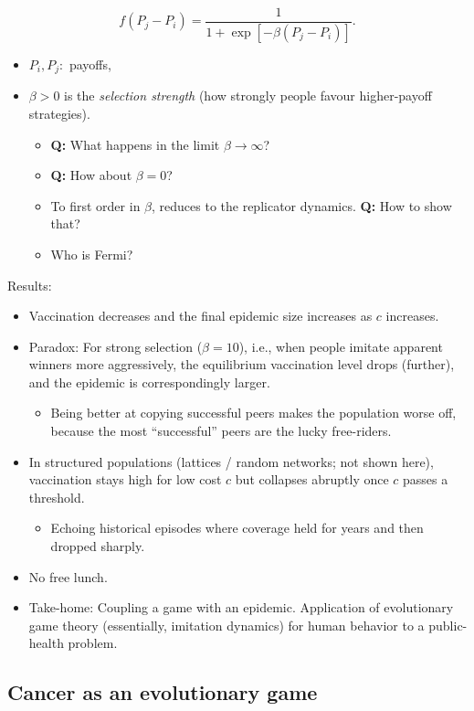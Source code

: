 \documentclass[20pt]{extarticle}
\begin{document}
\begin{itemize}
\[ f(P_j - P_i) = \frac{1}{1 + \exp[-\beta (P_j - P_i)]}. \]
	\begin{itemize}
	\item $P_i, P_j:$ payoffs,
	\item $\beta>0$ is the \emph{selection strength} (how strongly people favour higher-payoff strategies).
		\begin{itemize}
		\item \textbf{Q:} What happens in the limit $\beta\to\infty$?
		\item \textbf{Q:} How about $\beta = 0$?
		\item To first order in $\beta$, reduces to the replicator dynamics. \textbf{Q:} How to show that?
		\item Who is Fermi?
		\end{itemize}
	\end{itemize}
\end{itemize}

Results:
\begin{itemize}
\item Vaccination decreases and the final epidemic size increases as $c$ increases.
\item Paradox: For strong selection ($\beta = 10$), i.e., when people imitate apparent winners more aggressively, the equilibrium vaccination level drops (further), and the epidemic is correspondingly larger.
	\begin{itemize}
	\item Being better at copying successful peers makes the population worse off, because the most ``successful'' peers are the lucky free-riders.
	\end{itemize}
\item In structured populations (lattices / random networks; not shown here), vaccination stays high for low cost $c$ but collapses abruptly once $c$ passes a threshold.
	\begin{itemize}
	\item Echoing historical episodes where coverage held for years and then dropped sharply.
	\end{itemize}
\item No free lunch.
\item Take-home: Coupling a game with an epidemic. Application of evolutionary game theory (essentially, imitation dynamics) for human behavior to a public-health problem.
\end{itemize}

\subsection*{Cancer as an evolutionary game}
\end{document}
